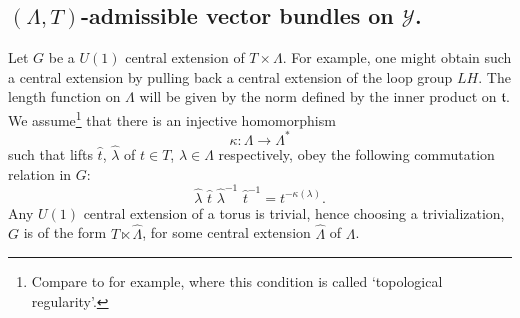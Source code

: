 \documentclass[11pt,reqno]{amsart}
\theoremstyle{definition}
\theoremstyle{remark}
\newcommand{\wh}[1]{\widehat{#1}}
\def\t{\ensuremath{\mathfrak{t}}}
\def\Y{\ensuremath{\mathcal{Y}}}
\def\hLambda{\ensuremath{\widehat{\Lambda}}}
\begin{document}
\subsection{$(\Lambda,T)$-admissible vector bundles on $\Y$.}\label{sec:SpinModY}
Let $G$ be a $U(1)$ central extension of $T \times \Lambda$.  For example, one might obtain such a central extension by pulling back a central extension of the loop group $LH$.  The length function on $\Lambda$ will be given by the norm defined by the inner product on $\t$.  We assume\footnote{Compare to \cite{FHTIII} for example, where this condition is called `topological regularity'.} that there is an injective homomorphism 
\[ \kappa \colon \Lambda \rightarrow \Lambda^\ast \]
such that lifts $\wh{t}$, $\wh{\lambda}$ of $t \in T$, $\lambda \in \Lambda$ respectively, obey the following commutation relation in $G$:
\begin{equation}
\label{eqn:CommutationRelation}
\wh{\lambda}\,\, \wh{t}\,\, \wh{\lambda}^{-1}\,\, \wh{t}^{-1}=t^{-\kappa(\lambda)}.
\end{equation}
Any $U(1)$ central extension of a torus is trivial, hence choosing a trivialization, $G$ is of the form $T \ltimes \hLambda$, for some central extension $\hLambda$ of $\Lambda$.
\end{document}
